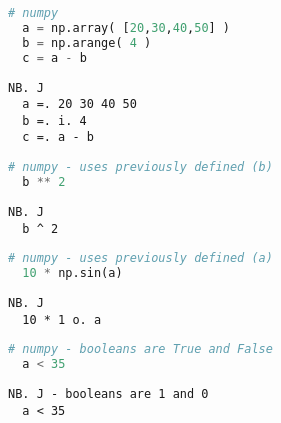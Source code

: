 \begin{tcolorbox}[breakable, size=fbox, boxrule=1pt, pad at break*=1mm,colback=cellbackground, colframe=cellborder]
\begin{lstlisting}[language=python, frame=single, framerule=0pt, basicstyle=\ttfamily\normalsize, keywordstyle=\bfseries\color{keywcolor}\normalsize]
  # numpy 
  a = np.array( [20,30,40,50] ) 
  b = np.arange( 4 ) 
  c = a - b  
\end{lstlisting}

\begin{lstlisting}[language=jdoc, frame=single, framerule=0pt, basicstyle=\ttfamily\normalsize, keywordstyle=\bfseries\color{keywcolor}\normalsize]   
  NB. J 
  a =. 20 30 40 50 
  b =. i. 4 
  c =. a - b  
\end{lstlisting}

\begin{lstlisting}[language=python, frame=single, framerule=0pt, basicstyle=\ttfamily\normalsize, keywordstyle=\bfseries\color{keywcolor}\normalsize] 
  # numpy - uses previously defined (b) 
  b ** 2  
\end{lstlisting}

\begin{lstlisting}[language=jdoc, frame=single, framerule=0pt, basicstyle=\ttfamily\normalsize, keywordstyle=\bfseries\color{keywcolor}\normalsize]  
  NB. J 
  b ^ 2
\end{lstlisting}

\begin{lstlisting}[language=python, frame=single, framerule=0pt, basicstyle=\ttfamily\normalsize, keywordstyle=\bfseries\color{keywcolor}\normalsize]
  # numpy - uses previously defined (a) 
  10 * np.sin(a)  
\end{lstlisting}

\begin{lstlisting}[language=jdoc, frame=single, framerule=0pt, basicstyle=\ttfamily\normalsize, keywordstyle=\bfseries\color{keywcolor}\normalsize]  
  NB. J 
  10 * 1 o. a  
\end{lstlisting}
  
\begin{lstlisting}[language=python, frame=single, framerule=0pt, basicstyle=\ttfamily\normalsize, keywordstyle=\bfseries\color{keywcolor}\normalsize]
  # numpy - booleans are True and False 
  a < 35  
\end{lstlisting}

\begin{lstlisting}[language=jdoc, frame=single, framerule=0pt, basicstyle=\ttfamily\normalsize, keywordstyle=\bfseries\color{keywcolor}\normalsize] 
  NB. J - booleans are 1 and 0 
  a < 35
\end{lstlisting}
\end{tcolorbox}

